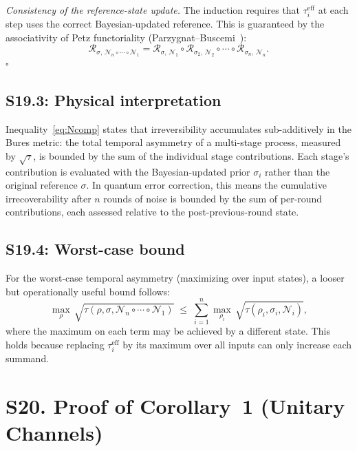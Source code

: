 \documentclass[prl,twocolumn,superscriptaddress,longbibliography]{revtex4-2}
\newcommand{\Petz}{\mathcal{R}}
\newcommand{\chan}{\mathcal{N}}
\newcommand{\tauasym}{\tau}
\begin{document}
\emph{Consistency of the reference-state update.}
The induction requires that $\tauasym_i^{\mathrm{eff}}$ at each
step uses the correct Bayesian-updated reference.  This is
guaranteed by the associativity of Petz functoriality
(Parzygnat--Buscemi~\cite{Parzygnat2023}):
\begin{equation}
\Petz_{\sigma,\,\chan_n \circ \cdots \circ \chan_1}
= \Petz_{\sigma,\,\chan_1}
  \circ \Petz_{\sigma_2,\,\chan_2}
  \circ \cdots
  \circ \Petz_{\sigma_n,\,\chan_n}.
\end{equation}
\hfill$\square$

\subsection{S19.3: Physical interpretation}

Inequality~\eqref{eq:Ncomp} states that irreversibility accumulates
sub-additively in the Bures metric: the total temporal
asymmetry of a multi-stage process, measured by $\sqrt{\tauasym}$,
is bounded by the sum of the individual stage contributions.
Each stage's contribution is
evaluated with the Bayesian-updated prior $\sigma_i$ rather than
the original reference $\sigma$.
In quantum error correction, this means the cumulative
irrecoverability after $n$ rounds of noise is bounded by the sum
of per-round contributions, each assessed relative to the
post-previous-round state.

\subsection{S19.4: Worst-case bound}

For the worst-case temporal asymmetry (maximizing over input
states), a looser but operationally useful bound follows:
\begin{equation}
\max_{\rho}\, \sqrt{\tauasym(\rho, \sigma, \chan_n \circ \cdots \circ \chan_1)}
\;\leq\;
\sum_{i=1}^{n}
\max_{\rho_i}\, \sqrt{\tauasym(\rho_i, \sigma_i, \chan_i)},
\label{eq:Ncomp_worst}
\end{equation}
where the maximum on each term may be achieved by a
different state.  This holds because replacing
$\tauasym_i^{\mathrm{eff}}$ by its maximum over all inputs can
only increase each summand.

\section{S20. Proof of Corollary~1 (Unitary Channels)}
\label{sec:S20}
\end{document}
